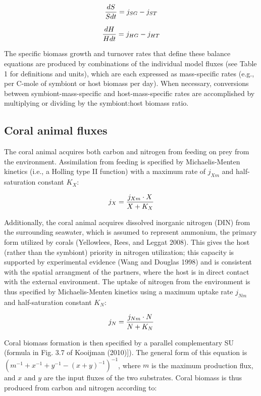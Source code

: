 \documentclass[]{elsarticle} %
\begin{document}
\begin{equation} {dS \over Sdt} = j_{SG} - j_{ST} \end{equation}

\begin{equation} {dH \over Hdt} = j_{HG} - j_{HT} \end{equation}

The specific biomass growth and turnover rates that define these balance
equations are produced by combinations of the individual model fluxes
(see Table 1 for definitions and units), which are each expressed as
mass-specific rates (e.g., per C-mole of symbiont or host biomass per
day). When necessary, conversions between symbiont-mass-specific and
host-mass-specific rates are accomplished by multiplying or dividing by
the symbiont:host biomass ratio.

\subsection{Coral animal fluxes}\label{coral-animal-fluxes}

The coral animal acquires both carbon and nitrogen from feeding on prey
from the environment. Assimilation from feeding is specified by
Michaelis-Menten kinetics (i.e., a Holling type II function) with a
maximum rate of \(j_{Xm}\) and half-saturation constant \(K_X\):

\begin{equation} j_X = {{j_{Xm} \cdot X} \over {X + K_X}} \end{equation}

Additionally, the coral animal acquires dissolved inorganic nitrogen
(DIN) from the surrounding seawater, which is assumed to represent
ammonium, the primary form utilized by corals (Yellowlees, Rees, and
Leggat 2008). This gives the host (rather than the symbiont) priority in
nitrogen utilization; this capacity is supported by experimental
evidence (Wang and Douglas 1998) and is consistent with the spatial
arrangment of the partners, where the host is in direct contact with the
external environment. The uptake of nitrogen from the environment is
thus specified by Michaelis-Menten kinetics using a maximum uptake rate
\(j_{Nm}\) and half-saturation constant \(K_N\):

\begin{equation} j_N = {{j_{Nm} \cdot N} \over {N + K_N}} \end{equation}

Coral biomass formation is then specified by a parallel complementary SU
(formula in Fig. 3.7 of Kooijman (2010){]}). The general form of this
equation is \((m^{-1} + x^{-1} + y^{-1} - (x + y)^{-1})^{-1}\), where
\(m\) is the maximum production flux, and \(x\) and \(y\) are the input
fluxes of the two substrates. Coral biomass is thus produced from carbon
and nitrogen according to:
\end{document}

